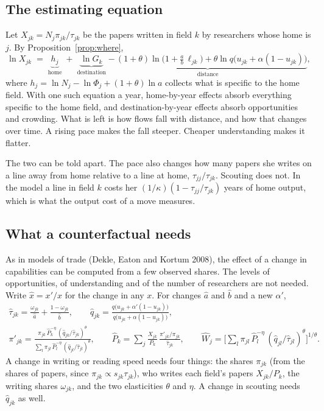 \documentclass[11pt,letterpaper]{article}
\begin{document}
\subsection{The estimating equation}

Let $X_{jk}=N_j\pi_{jk}/\tau_{jk}$ be the papers written in field $k$ by researchers whose home is $j$. By Proposition~\ref{prop:where},
\begin{equation}\label{eq:grav}
\ln X_{jk}\;=\;\underbrace{h_j}_{\text{home}}\;+\;\underbrace{\ln G_k}_{\text{destination}}\;\underbrace{-\,(1+\theta)\ln\!\big(1+\tfrac ab\,\ell_{jk}\big)+\theta\ln q\big(u_{jk}+\alpha(1-u_{jk})\big)}_{\text{distance}} ,
\end{equation}
where $h_j=\ln N_j-\ln\Phi_j+(1+\theta)\ln a$ collects what is specific to the home field.
With one such equation a year, home-by-year effects absorb everything specific to the home field, and destination-by-year effects absorb opportunities and crowding. What is left is how flows fall with distance, and how that changes over time. A rising pace makes the fall steeper. Cheaper understanding makes it flatter.

The two can be told apart. The pace also changes how many papers she writes on a line away from home relative to a line at home, $\tau_{jj}/\tau_{jk}$. Scouting does not. In the model a line in field $k$ costs her $(1/\kappa)(1-\tau_{jj}/\tau_{jk})$ years of home output, which is what the output cost of a move measures.

\subsection{What a counterfactual needs}

As in models of trade (Dekle, Eaton and Kortum 2008), the effect of a change in capabilities can be computed from a few observed shares. The levels of opportunities, of understanding and of the number of researchers are not needed. Write $\hat x=x'/x$ for the change in any $x$. For changes $\hat a$ and $\hat b$ and a new $\alpha'$,
\begin{gather*}
\hat\tau_{jk}=\frac{\omega_{jk}}{\hat a}+\frac{1-\omega_{jk}}{\hat b},\qquad
\hat q_{jk}=\frac{q\big(u_{jk}+\alpha'(1-u_{jk})\big)}{q\big(u_{jk}+\alpha(1-u_{jk})\big)},\\[3pt]
\pi'_{jk}=\frac{\pi_{jk}\,\hat P_k^{-\eta}\,(\hat q_{jk}/\hat\tau_{jk})^{\theta}}{\sum_l\pi_{jl}\,\hat P_l^{-\eta}\,(\hat q_{jl}/\hat\tau_{jl})^{\theta}},\qquad
\hat P_k=\sum_j\frac{X_{jk}}{P_k}\,\frac{\pi'_{jk}/\pi_{jk}}{\hat\tau_{jk}},\qquad
\hat W_j=\Big[\sum_l\pi_{jl}\,\hat P_l^{-\eta}\,(\hat q_{jl}/\hat\tau_{jl})^{\theta}\Big]^{1/\theta}.
\end{gather*}
A change in writing or reading speed needs four things: the shares $\pi_{jk}$ (from the shares of papers, since $\pi_{jk}\propto s_{jk}\tau_{jk}$), who writes each field's papers $X_{jk}/P_k$, the writing shares $\omega_{jk}$, and the two elasticities $\theta$ and $\eta$. A change in scouting needs $\hat q_{jk}$ as well.
\end{document}
